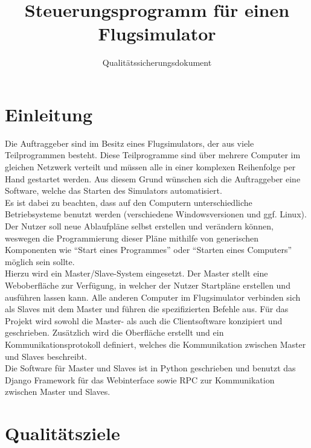 \documentclass[accentcolor=tud9c,12pt,paper=a4]{tudreport}
\title{Steuerungsprogramm für einen Flugsimulator}
\subtitle{Qualitätssicherungsdokument}
\begin{document}
	\maketitle
	\tableofcontents

	\chapter{Einleitung}
		Die Auftraggeber sind im Besitz eines Flugsimulators, der aus viele
		Teilprogrammen besteht. Diese Teilprogramme sind über mehrere Computer im
		gleichen Netzwerk verteilt und müssen alle in einer komplexen Reihenfolge per Hand
		gestartet werden. Aus diesem Grund wünschen sich die Auftraggeber eine Software, welche
		das Starten des Simulators automatisiert.\\[5pt]
		Es ist dabei zu beachten, dass auf den Computern unterschiedliche
		Betriebsysteme benutzt werden (verschiedene Windowsversionen und ggf. Linux).
		Der Nutzer soll neue Ablaufpläne selbst erstellen und verändern können,
		weswegen die Programmierung dieser Pläne mithilfe von generischen Komponenten
		wie "`Start eines Programmes"' oder "`Starten eines Computers"' möglich sein sollte.
		\\[5pt]
		Hierzu wird ein Master/Slave-System eingesetzt. Der Master stellt eine Weboberfläche zur
		Verfügung, in welcher der Nutzer Startpläne erstellen und ausführen lassen kann.
		Alle anderen Computer im Flugsimulator verbinden sich als Slaves mit dem Master und
		führen die spezifizierten Befehle aus.
		Für das Projekt wird sowohl die Master- als auch die Clientsoftware
		konzipiert und geschrieben. Zusätzlich wird die Oberfläche erstellt und ein
		Kommunikationsprotokoll definiert, welches die Kommunikation zwischen
		Master und Slaves beschreibt.
		\\[5pt]
		Die Software für Master und Slaves ist in Python geschrieben und benutzt
		das Django Framework für das Webinterface sowie RPC zur Kommunikation zwischen
		Master und Slaves.


	\chapter{Qualitätsziele}
\end{document}
